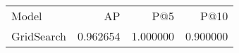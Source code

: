 \begin{tabular}{lrrr}
Model & AP & P@5 & P@10 \\
GridSearch & 0.962654 & 1.000000 & 0.900000 \\
\end{tabular}
